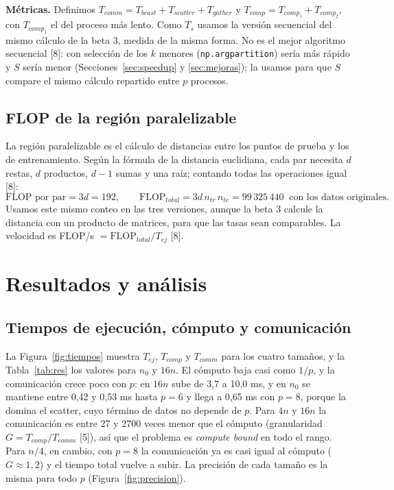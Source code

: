 \documentclass[11pt,a4paper]{article}
\newcommand{\ntr}{n_{tr}}
\newcommand{\nte}{n_{te}}
\begin{document}
\textbf{Métricas.} Definimos $T_{comm} = T_{bcast} + T_{scatter} + T_{gather}$ y $T_{comp} = T_{comp_1} + T_{comp_2}$, con $T_{comp_1}$ el del proceso más lento. Como $T_s$ usamos la versión secuencial del mismo cálculo de la beta 3, medida de la misma forma. No es el mejor algoritmo secuencial [8]: con selección de los $k$ menores (\texttt{np.argpartition}) sería más rápido y $S$ sería menor (Secciones~\ref{sec:speedup} y \ref{sec:mejoras}); la usamos para que $S$ compare el mismo cálculo repartido entre $p$ procesos.

\subsection{FLOP de la región paralelizable}

La región paralelizable es el cálculo de distancias entre los puntos de prueba y los de entrenamiento. Según la fórmula de la distancia euclidiana, cada par necesita $d$ restas, $d$ productos, $d-1$ sumas y una raíz; contando todas las operaciones igual [8]:
\[
\text{FLOP por par} = 3d = 192, \qquad \text{FLOP}_{total} = 3d\,\ntr\,\nte = 99\,325\,440 \ \text{ con los datos originales.}
\]
Usamos este mismo conteo en las tres versiones, aunque la beta 3 calcule la distancia con un producto de matrices, para que las tasas sean comparables. La velocidad es FLOP/s $= \text{FLOP}_{total}/T_{ej}$ [8].

\section{Resultados y análisis}

\subsection{Tiempos de ejecución, cómputo y comunicación}
\label{sec:tiempos}

La Figura~\ref{fig:tiempos} muestra $T_{ej}$, $T_{comp}$ y $T_{comm}$ para los cuatro tamaños, y la Tabla~\ref{tab:res} los valores para $n_0$ y $16n$. El cómputo baja casi como $1/p$, y la comunicación crece poco con $p$: en $16n$ sube de 3,7 a 10,0 ms, y en $n_0$ se mantiene entre 0,42 y 0,53 ms hasta $p = 6$ y llega a 0,65 ms con $p = 8$, porque la domina el scatter, cuyo término de datos no depende de $p$. Para $4n$ y $16n$ la comunicación es entre 27 y 2700 veces menor que el cómputo (granularidad $G = T_{comp}/T_{comm}$ [5]), así que el problema es \textit{compute bound} en todo el rango. Para $n/4$, en cambio, con $p = 8$ la comunicación ya es casi igual al cómputo ($G \approx 1{,}2$) y el tiempo total vuelve a subir. La precisión de cada tamaño es la misma para todo $p$ (Figura~\ref{fig:precision}).
\end{document}
